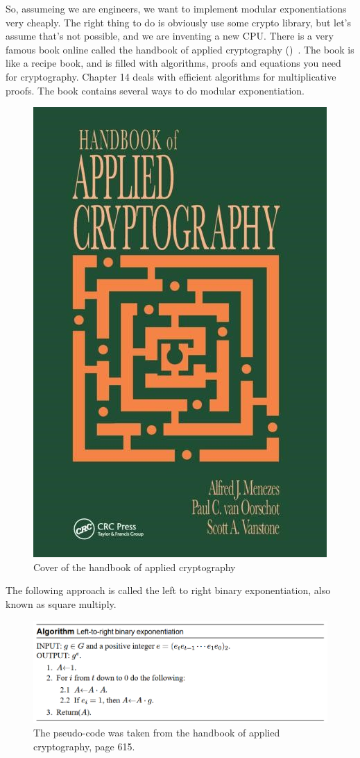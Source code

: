 So, assumeing we are engineers, we want to implement modular exponentiations very
cheaply. The right thing to do is obviously use some crypto library, but
let's assume that's not possible, and we are inventing a new CPU. There is a very 
famous book online called the handbook of applied cryptography
()~\cite{katz1996handbook}. The book is like a recipe book,
and is filled with algorithms, proofs and equations you need
for cryptography. Chapter 14 deals with efficient algorithms for multiplicative
proofs. The book contains several ways to do modular exponentiation. 

\begin{figure}[!ht]
    \centering
    \includegraphics{images/appliedCrypt.jpg}
    \caption{Cover of the handbook of applied cryptography} \label{fig:appliedCrypt}
\end{figure}

The following approach is called the left to right binary exponentiation, also
known as square multiply.
\begin{figure}[!ht]
    \centering
    \includegraphics[scale=0.4]{images/ltrbe.png}
    \caption{The pseudo-code was taken from the handbook of applied cryptography, page 615.} \label{fig:ltrbe}
\end{figure}

